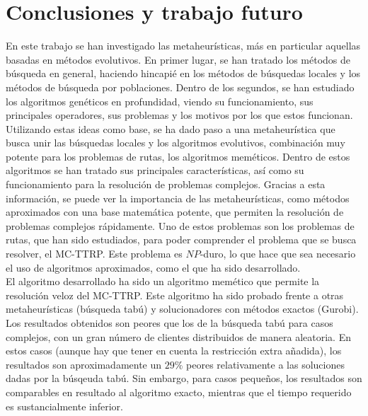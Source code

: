 \chapter{Conclusiones y trabajo futuro}\label{chapter:4}
En este trabajo se han investigado las metaheurísticas, más en particular aquellas basadas en métodos evolutivos. En primer lugar, se han tratado los métodos de búsqueda en general, haciendo hincapié en los métodos de búsquedas locales y los métodos de búsqueda por poblaciones. Dentro de los segundos, se han estudiado los algoritmos genéticos en profundidad, viendo su funcionamiento, sus principales operadores, sus problemas y los motivos por los que estos funcionan. Utilizando estas ideas como base, se ha dado paso a una metaheurística que busca unir las búsquedas locales y los algoritmos evolutivos, combinación muy potente para los problemas de rutas, los algoritmos meméticos. Dentro de estos algoritmos se han tratado sus principales características, así como su funcionamiento para la resolución de problemas complejos. Gracias a esta información, se puede ver la importancia de las metaheurísticas, como métodos aproximados con una base matemática potente, que permiten la resolución de problemas complejos rápidamente. Uno de estos problemas son los problemas de rutas, que han sido estudiados, para poder comprender el problema que se busca resolver, el MC-TTRP. Este problema es $NP$-duro, lo que hace que sea necesario el uso de algoritmos aproximados, como el que ha sido desarrollado.\\

El algoritmo desarrollado ha sido un algoritmo memético que permite la resolución veloz del MC-TTRP. Este algoritmo ha sido probado frente a otras metaheurísticas (búsqueda tabú) y solucionadores con métodos exactos (Gurobi). Los resultados obtenidos son peores que los de la búsqueda tabú para casos complejos, con un gran número de clientes distribuidos de manera aleatoria. En estos casos (aunque hay que tener en cuenta la restricción extra añadida), los resultados son aproximadamente un $29\%$ peores relativamente a las soluciones dadas por la búsqeuda tabú. Sin embargo, para casos pequeños, los resultados son comparables en resultado al algoritmo exacto, mientras que el tiempo requerido es sustancialmente inferior.\\

